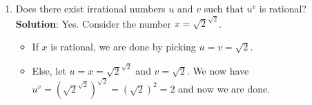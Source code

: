 \documentclass{article}
\newcommand{\soln}{\\ \textbf{Solution}: }
\newcommand{\bkt}[1]{\left(#1\right)}
\begin{document}
	\begin{enumerate}
		\item
		Does there exist irrational numbers $u$ and $v$ such that $u^v$ is rational?
		\soln
		Yes. Consider the number $x=\sqrt2^{\sqrt2}$.
		\begin{itemize}
			\item
			If $x$ is rational, we are done by picking $u=v = \sqrt2$.
			\item
			Else, let $u=x=\sqrt2^{\sqrt2}$ and $v=\sqrt2$. We now have $u^v = \bkt{\sqrt2^{\sqrt2}}^{\sqrt2} = \bkt{\sqrt2}^2 = 2$ and now we are done.
		\end{itemize}
	\end{enumerate}
\end{document}
